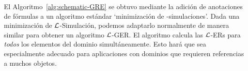 %


El Algoritmo~\ref{alg:schematic-GRE} se obtuvo mediante la adici\'on de anotaciones de f\'ormulas
a un algoritmo est\'andar `minimizaci\'on de \EL-simulaciones'. Dada una minimizaci\'on de
$\mathcal{L}$-Simulaci\'on, podemos adaptarlo normalmente de
manera similar para obtener un algoritmo $\mathcal{L}$-GER.
El algoritmo calcula las $\mathcal{L}$-ERs para \emph{todos} los elementos del
dominio simult\'aneamente.
Esto har\'a que sea especialmente adecuado para aplicaciones con
dominios que requieren referencias a muchos objetos.


%




